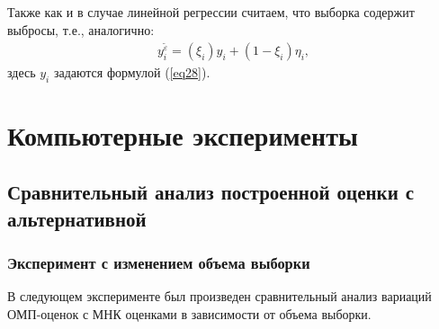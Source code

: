 Также как и в случае линейной регрессии считаем, что выборка содержит выбросы, т.е., аналогично:
\begin{eqnarray}
    y_i^{\widetilde{\varepsilon}}=(\xi_i)y_i+ (1-\xi_i)\eta_i,
\end{eqnarray}
здесь $y_i$ задаются формулой (\ref{eq28}).

\newpage
\section{Компьютерные эксперименты}

\subsection{Сравнительный анализ построенной оценки с альтернативной}
\subsubsection{Эксперимент с изменением объема выборки}
В следующем эксперименте был произведен сравнительный анализ вариаций ОМП-оценок с МНК оценками в зависимости от объема выборки.

